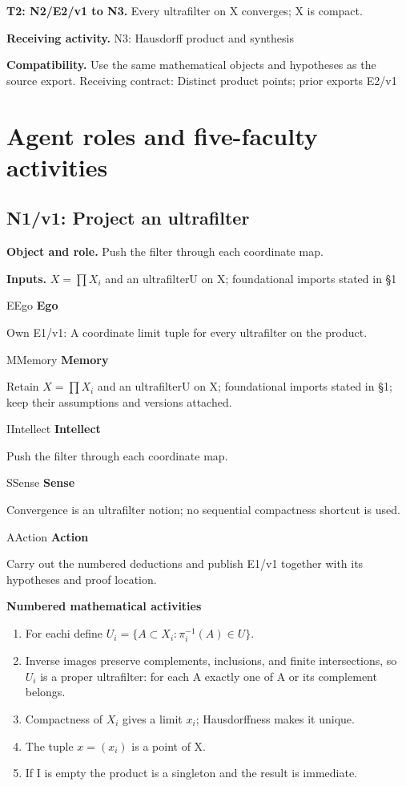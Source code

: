 \documentclass[preprint,12pt,aps,pra,showkeys,amsmath,amssymb,superscriptaddress,floatfix]{revtex4-2}
\theoremstyle{definition}
\theoremstyle{remark}
\newcommand{\mmfaculty}[3]{%
 \begin{mmfacultybox}{#1}{#2}
 {\sffamily\bfseries\color{MMBlue}#2}\par\smallskip #3
 \end{mmfacultybox}}
\newcommand{\field}[2]{\par\smallskip\noindent\textbf{#1.} #2\par}
\begin{document}
\field{T2: N2/E2/v1 to N3}{Every ultrafilter on X converges; X is compact.}

\field{Receiving activity}{N3: Hausdorff product and synthesis}

\field{Compatibility}{Use the same mathematical objects and hypotheses as the source export.
Receiving contract: Distinct product points; prior exports E2/v1}

\endgroup

\clearpage\section{Agent roles and five-faculty activities}\begingroup\small\linespread{1.05}\selectfont{}

\subsection{N1/v1: Project an ultrafilter}

\field{Object and role}{Push the filter through each coordinate map.}

\field{Inputs}{\(X=\prod X_i\) and an ultrafilterU on X; foundational imports stated in
§1}

\mmfaculty{E}{Ego}{Own E1/v1: A coordinate limit tuple for every ultrafilter on the
product.}

\mmfaculty{M}{Memory}{Retain \(X=\prod X_i\) and an ultrafilterU on X; foundational imports
stated in §1; keep their assumptions and versions attached.}

\mmfaculty{I}{Intellect}{Push the filter through each coordinate map.}

\mmfaculty{S}{Sense}{Convergence is an ultrafilter notion; no sequential compactness shortcut
is used.}

\mmfaculty{A}{Action}{Carry out the numbered deductions and publish E1/v1 together with its
hypotheses and proof location.}

\smallskip\noindent\textbf{Numbered mathematical activities}

\begin{enumerate}[label=N1.\arabic*,leftmargin=3.4em]

\item For eachi define \(U_i=\{A\subset X_i:\pi _i^{-1}(A)\in U\}\).

\item Inverse images preserve complements, inclusions, and finite
intersections, so \(U_i\) is a proper ultrafilter: for each A exactly
one of A or its complement belongs.

\item Compactness of \(X_i\) gives a limit \(x_i\); Hausdorffness makes it
unique.

\item The tuple \(x=(x_i)\) is a point of X.

\item If I is empty the product is a singleton and the result is immediate.

\end{enumerate}
\end{document}
